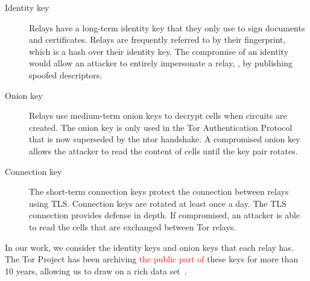 \begin{description}
    \item[Identity key]  Relays have a long-term identity key that they only use
        to sign documents and certificates.  Relays are frequently referred to
        by their fingerprint, which is a hash over their identity key.  The
        compromise of an identity would allow an attacker to entirely
        impersonate a relay, \eg, by publishing spoofed descriptors.
    \item[Onion key]  Relays use medium-term onion keys to decrypt cells when
        circuits are created.  The onion key is only used in the Tor
        Authentication Protocol that is now superseded by the ntor handshake.  A
        compromised onion key allows the attacker to read the content of cells
        until the key pair rotates.
    \item[Connection key] The short-term connection keys protect the connection
        between relays using TLS.  Connection keys are rotated at least once a
        day.  The TLS connection provides defense in depth.  If compromised, an
        attacker is able to read the cells that are exchanged between Tor
        relays.
\end{description}

In our work, we consider the identity keys and onion keys that each relay 
has.  The Tor Project has been archiving \textcolor{red}{the public part of} 
these keys for more than 10 years, 
allowing us to draw on a rich data set~\cite{collector}.


